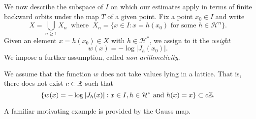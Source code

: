\documentclass[12pt,a4paper,reqno]{amsart}
\begin{document}
We now describe the subspace of $I$  on which our estimates apply  in terms of  finite backward orbits under the map $T$ of a given point.  Fix a point $x_0 \in I$ and write
\begin{equation}\label{eq:defX}
X = \bigcup_{n \ge 1} X_n \ \text{ where } \ X_n = \{ x \in I : x =  h(x_0) \text{ for some } h \in \mathcal{H}^n\}.
\end{equation}
 Given an element $x=h(x_0) \in X$ with $h \in \mathcal{H}^\ast$, we assign to it the \emph{weight}
\begin{equation}\label{eq:weight}
w(x) = - \log|J_h(x_0)|.
\end{equation}
We impose a further assumption, called  \emph{non-arithmeticity}.
\begin{assumption} \label{assump:nonarith}
We assume that the function $w$ does not take values lying in a lattice. That is, there does not exist $c  \in {\mathbb R}$ such that
\[
\{ w(x) = -\log |J_h(x)| : x \in I, h \in \mathcal{H}^\ast \text{ and $h(x) = x$}\} \subset c {\mathbb Z}.
\]
\end{assumption}
A familiar motivating example is provided by the Gauss map. 
\end{document}
